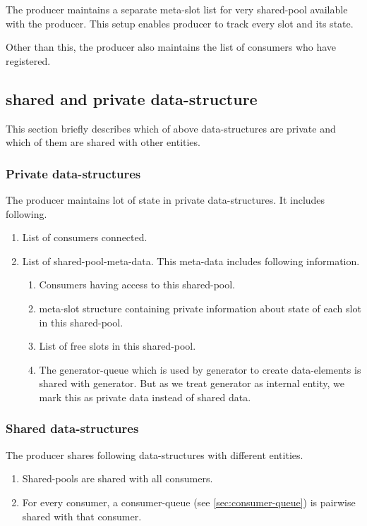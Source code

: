 \documentclass[a4paper,twoside]{report} %
\begin{document}
The producer maintains a separate meta-slot list for very shared-pool
available with the producer.  This setup enables producer to track 
every slot and its state.

Other than this, the producer also maintains the list of consumers who
have registered.

\subsection{shared and private data-structure}
This section briefly describes which of above data-structures are
private and which of them are shared with other entities.

\subsubsection{Private data-structures}
The producer maintains lot of state in private data-structures.  It
includes following.
\begin{enumerate}
  \item List of consumers connected. 
  \item List of shared-pool-meta-data. This meta-data includes
  following information.
    \begin{enumerate}
      \item Consumers having access to this shared-pool.
      \item meta-slot structure containing private information about
      state of each slot in this shared-pool.
      \item List of free slots in this shared-pool.
  \item The generator-queue which is used by generator to create
  data-elements is shared with generator. But as we treat generator as
  internal entity, we mark this as private data instead of shared
  data.
    \end{enumerate}
\end{enumerate}

\subsubsection{Shared data-structures}
The producer shares following data-structures with different entities.
\begin{enumerate}
  \item Shared-pools are shared with all consumers.
  \item For every consumer, a consumer-queue (see 
  \ref{sec:consumer-queue}) is pairwise shared with that consumer.
\end{enumerate}
\end{document}
